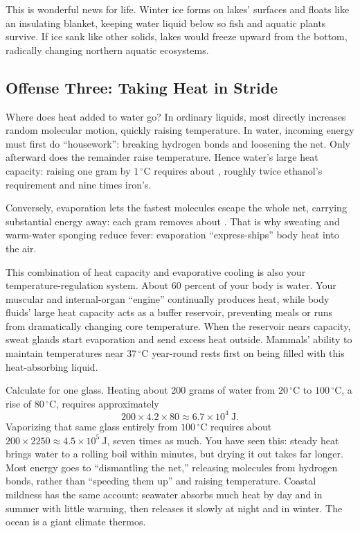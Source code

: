This is wonderful news for life. Winter ice forms on lakes' surfaces and floats like an insulating blanket, keeping water liquid below so fish and aquatic plants survive. If ice sank like other solids, lakes would freeze upward from the bottom, radically changing northern aquatic ecosystems.

\subsection{Offense Three: Taking Heat in Stride}

Where does heat added to water go? In ordinary liquids, most directly increases random molecular motion, quickly raising temperature. In water, incoming energy must first do ``housework'': breaking hydrogen bonds and loosening the net. Only afterward does the remainder raise temperature. Hence water's large heat capacity: raising one gram by $1\,^{\circ}\mathrm{C}$ requires about , roughly twice ethanol's requirement and nine times iron's.

Conversely, evaporation lets the fastest molecules escape the whole net, carrying substantial energy away: each gram removes about . That is why sweating and warm-water sponging reduce fever: evaporation ``express-ships'' body heat into the air.

This combination of heat capacity and evaporative cooling is also your temperature-regulation system. About 60 percent of your body is water. Your muscular and internal-organ ``engine'' continually produces heat, while body fluids' large heat capacity acts as a buffer reservoir, preventing meals or runs from dramatically changing core temperature. When the reservoir nears capacity, sweat glands start evaporation and send excess heat outside. Mammals' ability to maintain temperatures near $37\,^{\circ}\mathrm{C}$ year-round rests first on being filled with this heat-absorbing liquid.

\begin{qiaoliang}
Calculate for one glass. Heating about 200 grams of water from $20\,^{\circ}\mathrm{C}$ to $100\,^{\circ}\mathrm{C}$, a rise of $80\,^{\circ}\mathrm{C}$, requires approximately
\[200 \times 4.2 \times 80 \approx 6.7\times 10^{4}\ \mathrm{J}.\]
Vaporizing that same glass entirely from $100\,^{\circ}\mathrm{C}$ requires about $200 \times 2250 \approx 4.5\times 10^{5}\ \mathrm{J}$, seven times as much. You have seen this: steady heat brings water to a rolling boil within minutes, but drying it out takes far longer. Most energy goes to ``dismantling the net,'' releasing molecules from hydrogen bonds, rather than ``speeding them up'' and raising temperature. Coastal mildness has the same account: seawater absorbs much heat by day and in summer with little warming, then releases it slowly at night and in winter. The ocean is a giant climate thermos.
\end{qiaoliang}


